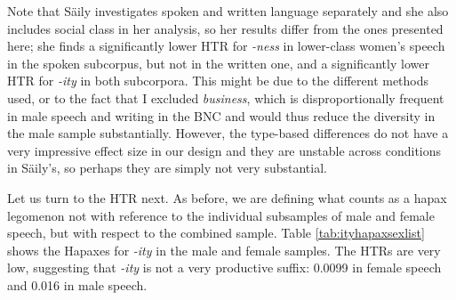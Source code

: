 Note that S\"{a}ily investigates spoken and written language separately and she also includes social class in her analysis, so her results differ from the ones presented here; she finds a significantly lower HTR for \textit{-ness} in lower-class women's speech in the spoken subcorpus, but not in the written one, and a significantly lower HTR for \textit{-ity} in both subcorpora. This might be due to the different methods used, or to the fact that I excluded \textit{business}, which is disproportionally frequent in male speech and writing in the BNC and would thus reduce the diversity in the male sample substantially. However, the type-based differences do not have a very impressive effect size in our design and they are unstable across conditions in S\"{a}ily's, so perhaps they are simply not very substantial.

Let us turn to the HTR next. As before, we are defining what counts as a hapax legomenon not with reference to the individual subsamples of male and female speech, but with respect to the combined sample. Table \ref{tab:ityhapaxsexlist} shows the Hapaxes for \textit{-ity} in the male and female samples. The HTRs are very low, suggesting that \textit{-ity} is not a very productive suffix: 0.0099 in female speech and 0.016 in male speech.

